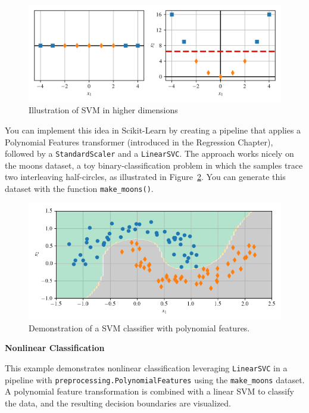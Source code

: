 \documentclass[12pt,letter]{article}
\begin{document}
\begin{figure}[H]
	\centering
	\includegraphics[width=6.5in]{../figures/SVM_higher_dimensions.png}
	\caption{Illustration of SVM in higher dimensions}
	\label{fig:SVM_higher_dimensions}
\end{figure}

You can implement this idea in Scikit-Learn by creating a pipeline that applies a Polynomial Features transformer (introduced in the Regression Chapter), followed by a \texttt{StandardScaler} and a \texttt{LinearSVC}. The approach works nicely on the moons dataset, a toy binary-classification problem in which the samples trace two interleaving half-circles, as illustrated in Figure~\ref{fig:SVM_polynomial_features}. You can generate this dataset with the function \texttt{make\_moons()}.

\begin{figure}[H]
	\centering
	\includegraphics[width=6.5in]{../figures/SVM_polynomial_features.png}
	\caption{Demonstration of a SVM classifier with polynomial features.}
	\label{fig:SVM_polynomial_features}
\end{figure}

\begin{example}
\textbf{Nonlinear Classification}

\noindent This example demonstrates nonlinear classification leveraging \texttt{LinearSVC} in a pipeline with \texttt{preprocessing.PolynomialFeatures} using the \texttt{make\_moons} dataset. A polynomial feature transformation is combined with a linear SVM to classify the data, and the resulting decision boundaries are visualized.
\end{example}
\end{document}
